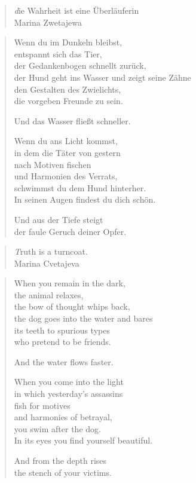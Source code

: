 
\cleartoverso


\begin{quote}
{\textit die Wahrheit ist eine Überläuferin}\\
Marina Zwetajewa
\end{quote}

\begin{verse}

Wenn du im Dunkeln bleibst,\\
entspannt sich das Tier,\\
der Gedankenbogen schnellt zurück,\\
der Hund geht ins Wasser und zeigt seine Zähne\\
den Gestalten des Zwielichts,\\
die vorgeben Freunde zu sein.

Und das Wasser fließt schneller.

Wenn du ans Licht kommst,\\
in dem die Täter von gestern\\
nach Motiven fischen\\
und Harmonien des Verrats,\\
schwimmst du dem Hund hinterher.\\
In seinen Augen findest du dich schön.

Und aus der Tiefe steigt\\
der faule Geruch deiner Opfer.

\end{verse}

\clearpage


\begin{quote}
{\textit Truth is a turncoat.}\\
Marina Cvetajeva
\end{quote}

\begin{verse}

When you remain in the dark,\\
the animal relaxes,\\
the bow of thought whips back,\\
the dog goes into the water and bares\\
its teeth to spurious types\\
who pretend to be friends.

And the water flows faster.

When you come into the light\\
in which yesterday's assassins\\
fish for motives\\
and harmonies of betrayal,\\
you swim after the dog.\\
In its eyes you find yourself beautiful.

And from the depth rises\\
the stench of your victims.

\end{verse}
